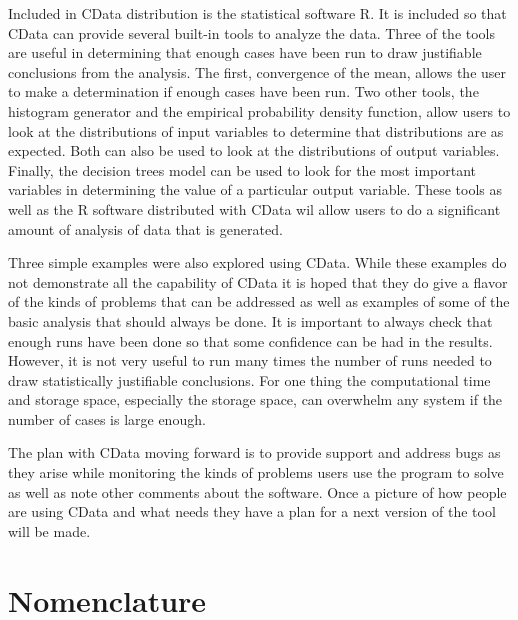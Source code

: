 \documentclass[12pt,twoside]{book}
\begin{document}
Included in CData distribution is the statistical software R. It is included so that CData can provide several built-in tools to analyze the data. Three of the tools are useful in determining that enough cases have been run to draw justifiable conclusions from the analysis. The first, convergence of the mean, allows the user to make a determination if enough cases have been run. Two other tools, the histogram generator and the empirical probability density function, allow users to look at the distributions of input variables to determine that distributions are as expected. Both can also be used to look at the distributions of output variables. Finally, the decision trees model can be used to look for the most important variables in determining the value of a particular output variable. These tools as well as the R software distributed with CData wil allow users to do a significant amount of analysis of data that is generated.

Three simple examples were also explored using CData. While these examples do not demonstrate all the capability of CData it is hoped that they do give a flavor of the kinds of problems that can be addressed as well as examples of some of the basic analysis that should always be done. It is important to always check that enough runs have been done so that some confidence can be had in the results. However, it is not very useful to run many times the number of runs needed to draw statistically justifiable conclusions. For one thing the computational time and storage space, especially the storage space, can overwhelm any system if the number of cases is large enough.

The plan with CData moving forward is to provide support and address bugs as they arise while monitoring the kinds of problems users use the program to solve as well as note other comments about the software. Once a picture of how people are using CData and what needs they have a plan for a next version of the tool will be made.





\appendix
{}

%
%

\chapter{Nomenclature}
\label{nomenclature}
\end{document}

